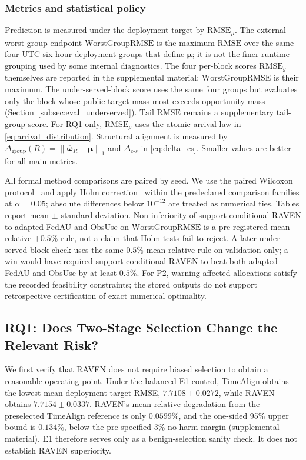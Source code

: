 \documentclass[letterpaper,journal]{IEEEtran}
\begin{document}
\subsubsection{Metrics and statistical policy}

Prediction is measured under the deployment target by
$\mathrm{RMSE}_{\mu}$.  The external worst-group endpoint
$\mathrm{WorstGroupRMSE}$ is the maximum $\mathrm{RMSE}$ over the same
four UTC six-hour deployment groups that define $\boldsymbol\mu$; it is
not the finer runtime grouping used by some internal diagnostics.
The four per-block scores $\mathrm{RMSE}_g$ themselves are reported in
the supplemental material; $\mathrm{WorstGroupRMSE}$ is their maximum.
The under-served-block score uses the same four groups but evaluates
only the block whose public target mass most exceeds opportunity mass
(Section~\ref{subsec:eval_underserved}).
$\mathrm{Tail\_RMSE}$ remains a supplementary tail-group score.
For RQ1 only, $\mathrm{RMSE}_{\rho}$ uses
the atomic arrival law in \eqref{eq:arrival_distribution}.  Structural
alignment is measured by
$\Delta_{\mathrm{group}}(R)=\left\|\overline{\boldsymbol\omega}_R-\boldsymbol\mu\right\|_1$
and $\Delta_{c\text{-}s}$ in \eqref{eq:delta_cs}.  Smaller values are
better for all main metrics.

All formal method comparisons are paired by seed.  We use the paired
Wilcoxon protocol~\cite{wilcoxon1945individual} and apply Holm
correction~\cite{holm1979simple} within the predeclared comparison
families at $\alpha=0.05$; absolute differences below
$10^{-12}$ are treated as numerical ties.  Tables report
mean $\pm$ standard deviation.  Non-inferiority of support-conditional RAVEN to
adapted FedAU and ObsUse on $\mathrm{WorstGroupRMSE}$ is a
pre-registered mean-relative $+0.5\%$ rule, not a claim that Holm
tests fail to reject.  A later under-served-block check uses the same
$0.5\%$ mean-relative rule on validation only; a win would have required
support-conditional RAVEN to beat both adapted FedAU and ObsUse by at least $0.5\%$.
For P2, warning-affected allocations satisfy
the recorded feasibility constraints; the stored outputs do not
support retrospective certification of exact numerical optimality.

\subsection{RQ1: Does Two-Stage Selection Change the Relevant Risk?}
\label{subsec:eval_rq1}

We first verify that RAVEN does not require biased selection to obtain a
reasonable operating point.  Under the balanced E1 control, TimeAlign obtains
the lowest mean deployment-target RMSE, $7.7108\pm0.0272$, while RAVEN obtains
$7.7154\pm0.0337$.  RAVEN's mean relative degradation from the preselected
TimeAlign reference is only $0.0599\%$, and the one-sided 95\% upper bound is
$0.134\%$, below the pre-specified 3\% no-harm margin
(supplemental material).  E1 therefore
serves only as a benign-selection sanity check.  It does not establish
RAVEN superiority.
\end{document}
